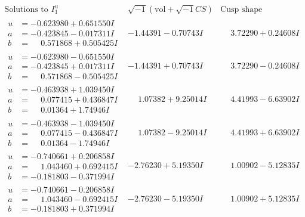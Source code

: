 \documentclass[1p]{elsarticle_modified}
\theoremstyle{definition}
\newcommand{\I}{\sqrt{-1}}
\begin{document}
$$\begin{array}{c|c|c}  
\text{Solutions to }I^u_{1}& \I (\text{vol} + \sqrt{-1}CS) & \text{Cusp shape}\\
 \hline 
\begin{aligned}
u &= -0.623980 + 0.651550 I \\
a &= -0.423845 - 0.017311 I \\
b &= \phantom{-}0.571868 + 0.505425 I\end{aligned}
 & -1.44391 - 0.70743 I & \phantom{-}3.72290 + 0.24608 I \\ \hline\begin{aligned}
u &= -0.623980 - 0.651550 I \\
a &= -0.423845 + 0.017311 I \\
b &= \phantom{-}0.571868 - 0.505425 I\end{aligned}
 & -1.44391 + 0.70743 I & \phantom{-}3.72290 - 0.24608 I \\ \hline\begin{aligned}
u &= -0.463938 + 1.039450 I \\
a &= \phantom{-}0.077415 + 0.436847 I \\
b &= \phantom{-}0.01364 + 1.74946 I\end{aligned}
 & \phantom{-}1.07382 + 9.25014 I & \phantom{-}4.41993 - 6.63902 I \\ \hline\begin{aligned}
u &= -0.463938 - 1.039450 I \\
a &= \phantom{-}0.077415 - 0.436847 I \\
b &= \phantom{-}0.01364 - 1.74946 I\end{aligned}
 & \phantom{-}1.07382 - 9.25014 I & \phantom{-}4.41993 + 6.63902 I \\ \hline\begin{aligned}
u &= -0.740661 + 0.206858 I \\
a &= \phantom{-}1.043460 + 0.692415 I \\
b &= -0.181803 - 0.371994 I\end{aligned}
 & -2.76230 + 5.19350 I & \phantom{-}1.00902 - 5.12835 I \\ \hline\begin{aligned}
u &= -0.740661 - 0.206858 I \\
a &= \phantom{-}1.043460 - 0.692415 I \\
b &= -0.181803 + 0.371994 I\end{aligned}
 & -2.76230 - 5.19350 I & \phantom{-}1.00902 + 5.12835 I \\ \hline\begin{aligned}

\end{aligned}
\end{array}$$
\end{document}
